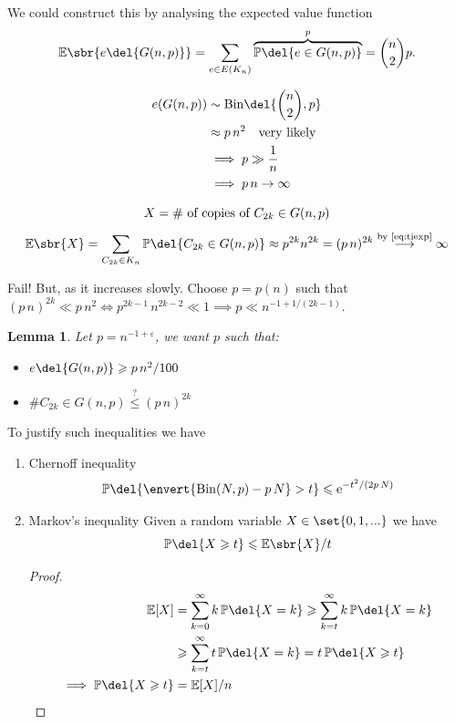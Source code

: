 \documentclass[english, dark, index]{Iart}
\newtheorem{lemma}{Lemma}[theorem]
\begin{document}
	We could construct this by analysing the expected value function
	\[ \mathbb{E}\sbr{e\del{G(n,p)}}=\sum_{e\in E(K_n)}\overbrace{\mathbb{P}\del{e\in G(n,p)}}^{p}=\binom{n}{2}p. \]
	
	\begin{align}
		e(G(n,p))&\sim\mathrm{Bin}\del{\binom{n}{2},p}\nonumber\\
		&\approx p\,n^{2}\quad\text{very likely}\nonumber\\
		&\implies p\gg \dfrac{1}{n}\nonumber\\
		&\implies p\,n\to\infty\label{eq:tiexp}
	\end{align}

	\[ X=\textup{\# of copies of }C_{2k}\in G(n,p) \]
	\[ \mathbb{E}\sbr{X}=\sum_{C_{2k}\in K_n} \mathbb{P}\del{C_{2k}\in G(n,p)}\approx p^{2k}n^{2k}=(p\,n)^{2k}\overset{\textup{by \ref{eq:tiexp}}}{\longrightarrow}\infty \]
	
	Fail! But, as it increases slowly. Choose $ p=p(n) $ such that $ (p\,n)^{2k}\ll p\,n^{2}\iff p^{2k-1}\,n^{2k-2}\ll 1\implies p\ll n^{-1+1/(2k-1)} $.
	
	\begin{lemma}
		Let $ p=n^{-1+\varepsilon} $, we want $ p $ such that:
		\begin{itemize}
			\item\label{item:ineq1} $ e\del{G(n,p)}\geqslant p\,n^{2}/100 $
			\item\label{item:ineq2} $ \# C_{2k}\in G(n,p)\overset{?}{\leqslant}(p\,n)^{2k} $
		\end{itemize}
	\end{lemma}

	To justify such inequalities we have
	\begin{enumerate}
		\item Chernoff inequality
		\[ \mathbb{P}\del{\envert{\mathrm{Bin}(N,p)-p\,N}>t}\leqslant \mathrm{e}^{-t^{2}/(2p\,N)} \]
		
		\item Markov's inequality
		Given a random variable $ X\in\set{0,1,...} $ we have
		\[ \mathbb{P}\del{X\geqslant t}\leqslant \mathbb{E}\sbr{X}/t \]
		
		\begin{proof}
			\begin{align*}
				\mathbb{E}[X]&=\sum_{k=0}^{\infty}k\,\mathbb{P}\del{X=k}\geqslant \sum_{k=t}^{\infty}k\,\mathbb{P}\del{X=k}\\
				&\geqslant \sum_{k=t}^{\infty}t\,\mathbb{P}\del{X=k}=t\,\mathbb{P}\del{X\geqslant t}\\
				\implies \mathbb{P}\del{X\geqslant t}&= \mathbb{E}[X]/n
			\end{align*}	
		\end{proof}
	\end{enumerate}
	
\end{document}
